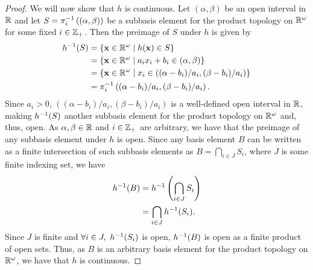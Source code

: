 \begin{solution}
\begin{proof}
        We will now show that $h$ is continuous.
        Let $(\alpha, \beta)$ be an open interval in $\mathbb{R}$ and let $S = \pi_i^{-1}\left((\alpha, \beta)\right)$ be a subbasis element for the product topology on $\mathbb{R}^\omega$ for some fixed $i \in \mathbb{Z}_+$.
        Then the preimage of $S$ under $h$ is given by
        \begin{align*}
            h^{-1}(S)    &= \{\mathbf{x} \in \mathbb{R}^\omega \mid h(\mathbf{x}) \in S\} \\
                        &= \{\mathbf{x} \in \mathbb{R}^\omega \mid a_i x_i + b_i \in (\alpha, \beta)\} \\
                        &= \{\mathbf{x} \in \mathbb{R}^\omega \mid x_i \in \left((\alpha - b_i) / a_i, (\beta - b_i) / a_i\right)\} \\
                        &= \pi_i^{-1}\left((\alpha - b_i) / a_i, (\beta - b_i) / a_i\right).
        \end{align*}
        Since $a_i > 0$, $\left((\alpha - b_i) / a_i, (\beta - b_i) / a_i\right)$ is a well-defined open interval in $\mathbb{R}$, making $h^{-1}(S)$ another subbasis element for the product topology on $\mathbb{R}^\omega$ and, thus, open.
        As $\alpha, \beta \in \mathbb{R}$ and $i \in \mathbb{Z}_+$ are arbitrary, we have that the preimage of any subbasis element under $h$ is open.
        Since any basis element $B$ can be written as a finite intersection of such subbasis elements as $B = \bigcap_{i \in J} S_i$, where $J$ is some finite indexing set, we have
        \begin{align*}
            h^{-1}(B)    &= h^{-1}\left(\bigcap_{i \in J} S_i\right) \\
                        &= \bigcap_{i \in J} h^{-1}(S_i).
        \end{align*}
        Since $J$ is finite and $\forall i \in J,~ h^{-1}(S_i)$ is open, $h^{-1}(B)$ is open as a finite product of open sets.
        Thus, as $B$ is an arbitrary basis element for the product topology on $\mathbb{R}^\omega$, we have that $h$ is continuous.


\end{proof}
\end{solution}
